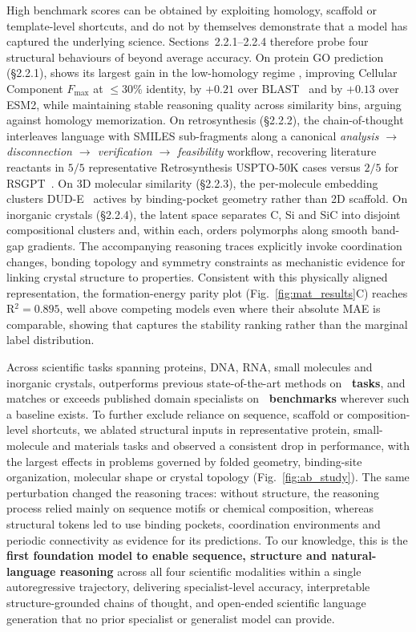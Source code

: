 High benchmark scores can be obtained by exploiting homology, scaffold or template-level shortcuts, and do not by themselves demonstrate that a model has captured the underlying science. 
Sections~2.2.1--2.2.4 therefore probe four structural behaviours of \projName{} beyond average accuracy. 
On protein GO prediction (\S2.2.1), \projName{} shows its largest gain in the low-homology regime , improving Cellular Component $F_{\max}$ at $\leq30\%$ identity, by $+0.21$ over BLAST~\citep{altschul1990blast} and by $+0.13$ over ESM2, while maintaining stable reasoning quality across similarity bins, arguing against homology memorization. 
On retrosynthesis (\S2.2.2), the chain-of-thought interleaves language with SMILES sub-fragments along a canonical \emph{analysis $\rightarrow$ disconnection $\rightarrow$ verification $\rightarrow$ feasibility} workflow, recovering literature reactants in $5/5$ representative Retrosynthesis USPTO-50K cases versus $2/5$ for RSGPT~\citep{deng2025rsgpt}. On 3D molecular similarity (\S2.2.3), the per-molecule embedding clusters DUD-E~\citep{mysinger2012directory} actives by binding-pocket geometry rather than 2D scaffold. 
On inorganic crystals (\S2.2.4), the latent space separates C, Si and SiC into disjoint compositional clusters and, within each, orders polymorphs along smooth band-gap gradients. 
The accompanying reasoning traces explicitly invoke coordination changes, bonding topology and symmetry constraints as mechanistic evidence for linking crystal structure to properties. 
Consistent with this physically aligned representation, the formation-energy parity plot (Fig.~\ref{fig:mat_results}C) reaches R$^{2}=0.895$, well above competing models even where their absolute MAE is comparable, showing that \projName{} captures the stability ranking rather than the marginal label distribution.

Across scientific tasks spanning proteins, DNA, RNA, small molecules and inorganic crystals, \projName{} outperforms previous state-of-the-art methods on \textbf{\totalSOTATasks~tasks}, and matches or exceeds published domain specialists on \textbf{\totalSOTATasksExperts~benchmarks} wherever such a baseline exists. 
To further exclude reliance on sequence, scaffold or composition-level shortcuts, we ablated structural inputs in representative protein, small-molecule and materials tasks and observed a consistent drop in performance, with the largest effects in problems governed by folded geometry, binding-site organization, molecular shape or crystal topology (Fig.~\ref{fig:ab_study}). The same perturbation changed the reasoning traces: without structure, the reasoning process relied mainly on sequence motifs or chemical composition, whereas structural tokens led \projName{} to use binding pockets, coordination environments and periodic connectivity as evidence for its predictions. 
To our knowledge, this is the \textbf{first foundation model to enable sequence, structure and natural-language reasoning} across all four scientific modalities within a single autoregressive trajectory, delivering specialist-level accuracy, interpretable structure-grounded chains of thought, and open-ended scientific language generation that no prior specialist or generalist model can provide.

